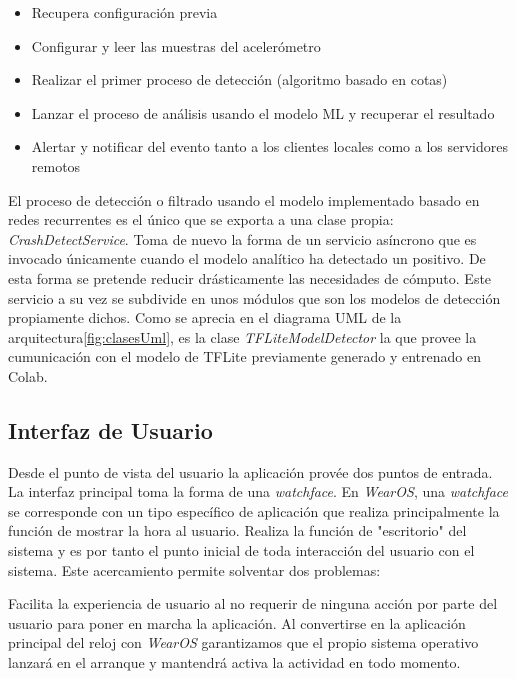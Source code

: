 \begin{itemize}
  \item Recupera configuración previa
  \item Configurar y leer las muestras del acelerómetro
  \item Realizar el primer proceso de detección (algoritmo basado en cotas)
  \item Lanzar el proceso de análisis usando el modelo ML y recuperar el resultado
  \item Alertar y notificar del evento tanto a los clientes locales como a los servidores remotos
\end{itemize}

El proceso de detección o filtrado usando el modelo implementado basado en redes recurrentes es el único que se exporta a una clase propia: \textit{CrashDetectService}. Toma de nuevo la forma de un servicio asíncrono que es invocado únicamente cuando el modelo analítico ha detectado un positivo. De esta forma se pretende reducir drásticamente las necesidades de cómputo. Este servicio a su vez se subdivide en unos módulos que son los modelos de detección propiamente dichos. Como se aprecia en el diagrama UML de la arquitectura\ref{fig:clasesUml}, es la clase \textit{TFLiteModelDetector} la que provee la cumunicación con el modelo de TFLite previamente generado y entrenado en Colab.


\subsection{Interfaz de Usuario}
Desde el punto de vista del usuario la aplicación provée dos puntos de entrada. La interfaz principal toma la forma de una \textit{watchface}. En \textit{WearOS}, una \textit{watchface} se corresponde con un tipo específico de aplicación que realiza principalmente la función de mostrar la hora al usuario. Realiza la función de "escritorio" del sistema y es por tanto el punto inicial de toda interacción del usuario con el sistema. Este acercamiento permite solventar dos problemas:

Facilita la experiencia de usuario al no requerir de ninguna acción por parte del usuario para poner en marcha la aplicación. Al convertirse en la aplicación principal del reloj con  \textit{WearOS} garantizamos que el propio sistema operativo lanzará en el arranque y mantendrá activa la actividad en todo momento.

